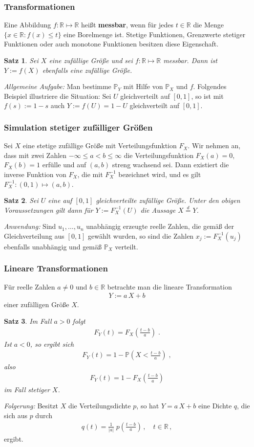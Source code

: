 \documentclass[ngerman,draft,parskip=half,twoside]{scrartcl}
\newtheorem{thm}{Satz}[section]
\newcommand*{\R}{\mathbb{R}}      %
\newcommand*{\WKM}{\mathbb{P}}      %
\begin{document}
\subsubsection{Transformationen}
Eine Abbildung $f\colon\R\mapsto\R$ heißt \textbf{messbar}, wenn für jedes $t\in\R$ die
Menge $\{x\in \R \colon f(x)\le t\}$ eine Borelmenge ist. Stetige Funktionen, Grenzwerte stetiger
Funktionen oder auch monotone Funktionen besitzen diese Eigenschaft.
\begin{thm}
Sei $X$ eine zufällige Größe und sei $f\colon\R\mapsto\R$ messbar. Dann ist $Y:=f(X)$ ebenfalls
eine zufällige Größe.
\end{thm}
\textit{Allgemeine Aufgabe:} Man bestimme $\WKM_Y$ mit Hilfe von $\WKM_X$ und $f$.
Folgendes Beispiel illustriere die Situation: Sei $U$ gleichverteilt auf $[0,1]$, so ist mit
$f(s):=1-s$ auch $Y:=f(U)=1-U$ gleichverteilt auf $[0,1]$.
\subsubsection{Simulation stetiger zufälliger Größen}
Sei $X$ eine stetige zufällige Größe mit Verteilungsfunktion $F_X$. Wir nehmen an,
dass mit zwei Zahlen
$-\infty\le a<b\le\infty$ die Verteilungsfunktion $F_X(a)=0$, $F_X(b)=1$ erfülle  und
auf $(a,b)$ streng wachsend sei. Dann
existiert die inverse Funktion von $F_X$, die mit $F_X^{-1}$ bezeichnet wird, und es
gilt $F_X^{-1}\colon(0,1)\mapsto (a,b)$.
\begin{thm}
Sei $U$ eine auf $[0,1]$ gleichverteilte zufällige Größe. Unter den
obigen Voraussetzungen gilt dann für $Y:=F_X^{-1}(U)$ die Aussage
$X\stackrel{d}{=} Y$.
\end{thm}
\textit{Anwendung:} Sind $u_1,\ldots,u_n$ unabhängig erzeugte reelle Zahlen, die gemäß der
Gleichverteilung aus $[0,1]$ gewählt wurden, so sind die Zahlen $x_j:= F_X^{-1}(u_j)$ ebenfalls unabhängig
und gemäß $\WKM_X$ verteilt.
\subsubsection{Lineare Transformationen}
Für reelle Zahlen $a\not=0$ und $b\in\R$ betrachte man die lineare Transformation
\begin{gather*}
  Y:=a\,X+ b
\end{gather*}
einer zufälligen Größe $X$.
\begin{thm}
Im Fall $a>0$ folgt
  \begin{gather*}
    F_Y(t)=F_X\left(\frac{t-b}{a}\right)\;.
  \end{gather*}
Ist $a<0$, so ergibt sich
  \begin{gather*}
    F_Y(t)=1-\WKM\left(X<\frac{t-b}{a}\right)\;,
  \end{gather*}
also
  \begin{gather*}
    F_Y(t)=1-F_X\left(\frac{t-b}{a}\right)
  \end{gather*}
im Fall stetiger $X$.
\end{thm}
\textit{Folgerung:} Besitzt $X$ die Verteilungsdichte $p$, so hat $Y=a\,X+b$ eine Dichte $q$,
die sich aus $p$ durch
\begin{gather*}
  q(t)=\frac{1}{|a|}\;p\left(\frac{t-b}{a}\right)\,,\quad t\in\R\,,
\end{gather*}
ergibt.
\end{document}
